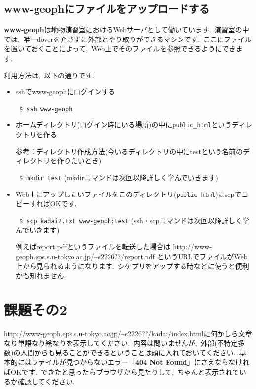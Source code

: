 \documentclass{jarticle}
\begin{document}
\subsection{www-geophにファイルをアップロードする}
{\bf www-geoph}は地物演習室におけるWebサーバとして働いています.\ 
演習室の中では,\ 唯一doverを介さずに外部とやり取りができるマシンです.\ 
ここにファイルを置いておくことによって,\ Web上でそのファイルを参照できるようにできます.\ 

利用方法は,\ 以下の通りです.\ 
\begin{itemize}
\item sshでwww-geophにログインする

\verb| $ ssh www-geoph| 

\item ホームディレクトリ(ログイン時にいる場所)の中に\verb|public_html|というディレクトリを作る

参考：ディレクトリ作成方法(今いるディレクトリの中にtestという名前のディレクトリを作りたいとき)

\verb| $ mkdir test| (mkdirコマンドは次回以降詳しく学んでいきます)

\item Web上にアップしたいファイルをこのディレクトリ(\verb|public_html|)にscpでコピーすればOKです.\ 

\verb| $ scp kadai2.txt www-geoph:test| (ssh・scpコマンドは次回以降詳しく学んでいきます)

例えばreport.pdfというファイルを転送した場合は
\url{http://www-geoph.eps.s.u-tokyo.ac.jp/~s2226??/report.pdf}
というURLでファイルがWeb上から見られるようになります.\ 
シケプリをアップする時などに使うと便利かも知れません.\ 
\end{itemize}

\section{課題その2}
\url{http://www-geoph.eps.s.u-tokyo.ac.jp/~s2226??/kadai/index.html}に何かしら文章なり単語なり絵なりを表示してください.\ 
内容は問いませんが,\ 外部(不特定多数)の人間からも見ることができるということは頭に入れておいてください.\ 
基本的にはファイルが見つからないエラー「{\bf 404 Not Found}」にさえならなければOKです.\ 
できたと思ったらブラウザから見たりして,\ ちゃんと表示されているか確認してください.\ 

\vspace{1em}
\end{document}
